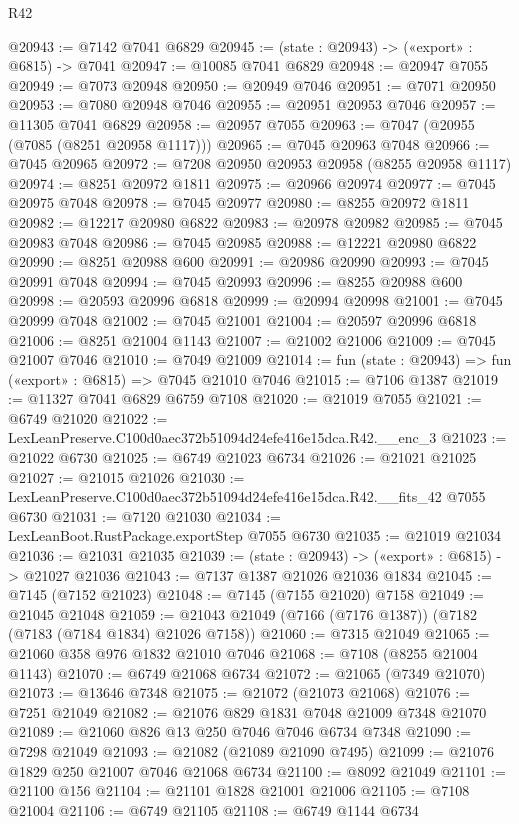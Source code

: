 \begin{lexlean}{R42}
\begin{coremodule}
{@20943 := @7142 @7041 @6829
@20945 := (state : @20943) -> («export» : @6815) -> @7041
@20947 := @10085 @7041 @6829
@20948 := @20947 @7055
@20949 := @7073 @20948
@20950 := @20949 @7046
@20951 := @7071 @20950
@20953 := @7080 @20948 @7046
@20955 := @20951 @20953 @7046
@20957 := @11305 @7041 @6829
@20958 := @20957 @7055
@20963 := @7047 (@20955 (@7085 (@8251 @20958 @1117)))
@20965 := @7045 @20963 @7048
@20966 := @7045 @20965
@20972 := @7208 @20950 @20953 @20958 (@8255 @20958 @1117)
@20974 := @8251 @20972 @1811
@20975 := @20966 @20974
@20977 := @7045 @20975 @7048
@20978 := @7045 @20977
@20980 := @8255 @20972 @1811
@20982 := @12217 @20980 @6822
@20983 := @20978 @20982
@20985 := @7045 @20983 @7048
@20986 := @7045 @20985
@20988 := @12221 @20980 @6822
@20990 := @8251 @20988 @600
@20991 := @20986 @20990
@20993 := @7045 @20991 @7048
@20994 := @7045 @20993
@20996 := @8255 @20988 @600
@20998 := @20593 @20996 @6818
@20999 := @20994 @20998
@21001 := @7045 @20999 @7048
@21002 := @7045 @21001
@21004 := @20597 @20996 @6818
@21006 := @8251 @21004 @1143
@21007 := @21002 @21006
@21009 := @7045 @21007 @7046
@21010 := @7049 @21009
@21014 := fun (state : @20943) => fun («export» : @6815) => @7045 @21010 @7046
@21015 := @7106 @1387
@21019 := @11327 @7041 @6829 @6759 @7108
@21020 := @21019 @7055
@21021 := @6749 @21020
@21022 := LexLeanPreserve.C100d0aec372b51094d24efe416e15dca.R42.__enc_3
@21023 := @21022 @6730
@21025 := @6749 @21023 @6734
@21026 := @21021 @21025
@21027 := @21015 @21026
@21030 := LexLeanPreserve.C100d0aec372b51094d24efe416e15dca.R42.__fits_42 @7055 @6730
@21031 := @7120 @21030
@21034 := LexLeanBoot.RustPackage.exportStep @7055 @6730
@21035 := @21019 @21034
@21036 := @21031 @21035
@21039 := (state : @20943) -> («export» : @6815) -> @21027 @21036
@21043 := @7137 @1387 @21026 @21036 @1834
@21045 := @7145 (@7152 @21023)
@21048 := @7145 (@7155 @21020) @7158
@21049 := @21045 @21048
@21059 := @21043 @21049 (@7166 (@7176 @1387)) (@7182 (@7183 (@7184 @1834) @21026 @7158))
@21060 := @7315 @21049
@21065 := @21060 @358 @976 @1832 @21010 @7046
@21068 := @7108 (@8255 @21004 @1143)
@21070 := @6749 @21068 @6734
@21072 := @21065 (@7349 @21070)
@21073 := @13646 @7348
@21075 := @21072 (@21073 @21068)
@21076 := @7251 @21049
@21082 := @21076 @829 @1831 @7048 @21009 @7348 @21070
@21089 := @21060 @826 @13 @250 @7046 @7046 @6734 @7348
@21090 := @7298 @21049
@21093 := @21082 (@21089 @21090 @7495)
@21099 := @21076 @1829 @250 @21007 @7046 @21068 @6734
@21100 := @8092 @21049
@21101 := @21100 @156
@21104 := @21101 @1828 @21001 @21006
@21105 := @7108 @21004
@21106 := @6749 @21105
@21108 := @6749 @1144 @6734
}
\end{coremodule}
\end{lexlean}
